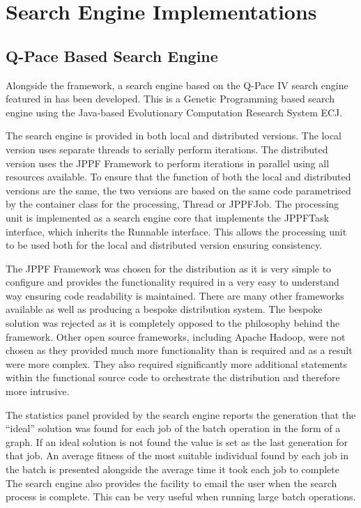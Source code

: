 \section{Search Engine Implementations}
\label{sec:provsearcheng}
\subsection{Q-Pace Based Search Engine}
Alongside the framework, a search engine based on the Q-Pace IV search engine featured in \cite{masseythesis} has been developed.
This is a Genetic Programming based search engine using the Java-based Evolutionary Computation Research System ECJ\cite{ecjtool}.

The search engine is provided in both local and distributed versions.
The local version uses separate threads to serially perform iterations.
The distributed version uses the JPPF Framework\cite{jppfweb} to perform iterations in parallel using all resources available.
To ensure that the function of both the local and distributed versions are the same, the two versions are based on the same code parametrised by the container class for the processing, Thread or JPPFJob.
The processing unit is implemented as a search engine core that implements the JPPFTask interface, which inherits the Runnable interface.
This allows the processing unit to be used both for the local and distributed version ensuring consistency.

The JPPF Framework was chosen for the distribution as it is very simple to configure and provides the functionality required in a very easy to understand way ensuring code readability is maintained.
There are many other frameworks available as well as producing a bespoke distribution system.
The bespoke solution was rejected as it is completely opposed to the philosophy behind the framework.
Other open source frameworks, including Apache Hadoop\cite{apahadoop}, were not chosen as they provided much more functionality than is required and as a result were more complex.
They also required significantly more additional statements within the functional source code to orchestrate the distribution and therefore more intrusive.

The statistics panel provided by the search engine reports the generation that the ``ideal'' solution was found for each job of the batch operation in the form of a graph.
If an ideal solution is not found the value is set as the last generation for that job.
An average fitness of the most suitable individual found by each job in the batch is presented alongside the average time it took each job to complete
The search engine also provides the facility to email the user when the search process is complete.
This can be very useful when running large batch operations.

